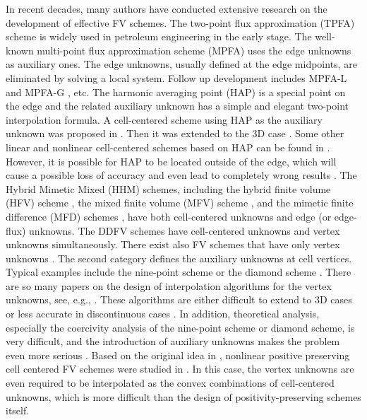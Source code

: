 \documentclass[times,review,preprint,authoryear]{elsarticle}
\begin{document}
In recent decades, many authors have conducted extensive research on the development of effective FV schemes.
The two-point flux approximation (TPFA) scheme  is  widely used in petroleum engineering in the early stage. The  well-known multi-point flux approximation scheme (MPFA) \cite{Aavatsmark2002, Aavatsmark1998}  uses the edge  unknowns as  auxiliary ones. The edge unknowns, usually defined at the edge midpoints,  are  eliminated by solving a  local system. Follow up development includes MPFA-L \cite{Aavatsmark2008} and MPFA-G \cite{Agelas2010}, etc.    The harmonic averaging  point (HAP) is a special point on the edge and the related auxiliary unknown has a simple and elegant two-point interpolation formula. A cell-centered scheme using HAP as the auxiliary unknown was proposed in \cite{Agelas-Eymard2009}.
Then it was extended to the  3D case \cite{Eymard-Herbin2012}.  Some other linear and nonlinear cell-centered schemes based on HAP can be found in \cite{Lipnikov2012, wugaodai2012, sunwuzhang2013, Gao-Wu2013}.  However, it is possible for HAP to be located outside of the edge, which will cause a possible loss of accuracy and even lead to completely wrong results \cite{Terekhov2017, WZhang2020, Xie-Xu2021}. The  Hybrid Mimetic Mixed (HHM) schemes,  including the  hybrid finite volume (HFV) scheme \cite{Eymard2010}, the  mixed finite volume (MFV) scheme \cite{Droniou2006}, and the  mimetic finite difference (MFD) schemes \cite{Brezzi2005_1,Brezzi2005_2, Shashkov1995,Morel1998}, have both cell-centered unknowns and edge (or edge-flux) unknowns. The  DDFV schemes  \cite{Hermeline2000, Andreianov2007, su2018} have  cell-centered unknowns and vertex unknowns simultaneously. There exist also FV schemes that have only vertex unknowns \cite{Edwards-Zheng, Wu-Gao-Dai}. The second category  defines the auxiliary unknowns at cell vertices. Typical examples include the  nine-point scheme or the diamond scheme  \cite{li1980, Y-J-P, Wu-Dai-Gao-Yuan, gao-wu,C-C-L-C}. There are so many papers on the design of interpolation algorithms for the vertex unknowns, see, e.g., \cite{Y-J-P, gao-wu}. These algorithms are either difficult to extend to 3D cases or less accurate in discontinuous cases \cite{MiaoWu2022}.  In addition, theoretical analysis, especially the coercivity analysis of the nine-point scheme or diamond scheme, is very difficult, and the introduction of auxiliary unknowns makes the problem even more serious \cite{Y-J-P}.
Based on the original idea in \cite{Potier CL},  nonlinear positive preserving cell centered FV schemes were studied in \cite{Lipnikov2007, yuan2008}. In this case,  the vertex unknowns are even required to be interpolated as the convex combinations of  cell-centered unknowns, which is  more difficult than the design of positivity-preserving schemes itself.
\end{document}
